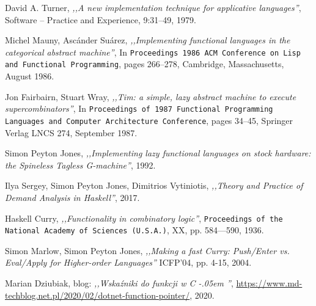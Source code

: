 \documentclass[en]{pracamgr}
\newcommand{\shrp}{%
  {\settoheight{\dimen0}{C}\kern-.05em \resizebox{!}{\dimen0}{\raisebox{\depth}{\textbf{\#}}}\hspace{1ex}}}
\begin{document}
\begin{thebibliography}{99}
 David A. Turner, \textit{,,A new implementation technique for applicative languages''}, Software -- Practice and Experience, 9:31–49, 1979.

 Michel Mauny, Asc\'ander Su\'arez, \textit{,,Implementing functional languages in the categorical abstract machine''}, In \texttt{Proceedings 1986 ACM Conference on Lisp and Functional Programming}, pages 266–278, Cambridge, Massachusetts, August 1986.

 Jon Fairbairn, Stuart Wray, \textit{,,Tim: a simple, lazy abstract machine to execute supercombinators''},  In \texttt{Proceedings of 1987 Functional Programming Languages and Computer Architecture Conference}, pages 34–45, Springer Verlag LNCS 274, September 1987.

 Simon Peyton Jones, \textit{,,Implementing lazy functional languages on stock hardware: the Spineless Tagless G-machine''}, 1992.

 Ilya Sergey, Simon Peyton Jones, Dimitrios Vytiniotis, \textit{,,Theory and Practice of Demand Analysis in Haskell''}, 2017.

 Haskell Curry, \textit{,,Functionality in combinatory logic''}, \texttt{Proceedings
of the National Academy of Sciences (U.S.A.)}, XX, pp. 584—590, 1936.

 Simon Marlow, Simon Peyton Jones, \textit{,,Making a fast Curry: Push/Enter vs. Eval/Apply for Higher-order Languages''} ICFP'04, pp. 4-15, 2004.

 Marian Dziubiak, blog: \textit{,,Wskaźniki do funkcji w C\shrp''},
    \url{https://www.md-techblog.net.pl/2020/02/dotnet-function-pointer/}, 2020.

\end{thebibliography}
\end{document}

